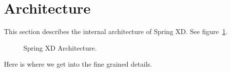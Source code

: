 \section{Architecture}
This section describes the internal architecture of Spring XD. See figure~\ref{fig:architecture}.

\begin{figure}[ht]
\centering
{}
\caption{Spring XD Architecture.}
\label{fig:architecture}
\end{figure}

Here is where we get into the fine grained details.